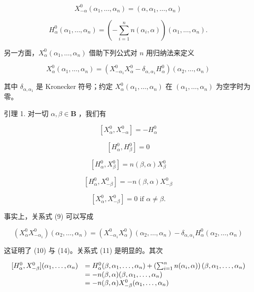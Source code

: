 \[
X _ {- \alpha} ^ {0} (\alpha_ {1}, \ldots , \alpha_ {n}) = (\alpha , \alpha_ {1}, \ldots , \alpha_ {n})\tag{7}
\]

\[
H _ {\alpha} ^ {0} \left(\alpha_ {1}, \dots , \alpha_ {n}\right) = \left(- \sum_ {i = 1} ^ {n} n \left(\alpha_ {i}, \alpha\right)\right) \left(\alpha_ {1}, \dots , \alpha_ {n}\right).\tag{8}
\]

另一方面，\(X_{\alpha}^{0}(\alpha_{1},\ldots ,\alpha_{n})\) 借助下列公式对 \(n\) 用归纳法来定义

\[
X _ {\alpha} ^ {0} (\alpha_ {1}, \ldots , \alpha_ {n}) = (X _ {- \alpha_ {1}} ^ {0} X _ {\alpha} ^ {0} - \delta_ {\alpha , \alpha_ {1}} H _ {\alpha} ^ {0}) (\alpha_ {2}, \ldots , \alpha_ {n})\tag{9}
\]

其中 \(\delta_{\alpha, \alpha_1}\) 是 Kronecker 符号；约定 \(X_{\alpha}^{0}(\alpha_{1}, \ldots, \alpha_{n})\) 在 \((\alpha_{1}, \ldots, \alpha_{n})\) 为空字时为零。

引理 1. 对一切 \(\alpha, \beta \in \mathbf{B}\) ，我们有

\[
[ X _ {\alpha} ^ {0}, X _ {- \alpha} ^ {0} ] = - H _ {\alpha} ^ {0}\tag{10}
\]

\[
[ H _ {\alpha} ^ {0}, H _ {\beta} ^ {0} ] = 0\tag{11}
\]

\[
[ H _ {\alpha} ^ {0}, X _ {\beta} ^ {0} ] = n (\beta , \alpha) X _ {\beta} ^ {0}\tag{12}
\]

\[
[ H _ {\alpha} ^ {0}, X _ {- \beta} ^ {0} ] = - n (\beta , \alpha) X _ {- \beta} ^ {0}\tag{13}
\]

\[
[ X _ {\alpha} ^ {0}, X _ {- \beta} ^ {0} ] = 0 \text {   if   } \alpha \neq \beta .\tag{14}
\]

事实上，关系式 (9) 可以写成

\[
(X _ {\alpha} ^ {0} X _ {- \alpha_ {1}} ^ {0}) (\alpha_ {2}, \ldots , \alpha_ {n}) = (X _ {- \alpha_ {1}} ^ {0} X _ {\alpha} ^ {0}) (\alpha_ {2}, \ldots , \alpha_ {n}) - \delta_ {\alpha , \alpha_ {1}} H _ {\alpha} ^ {0} (\alpha_ {2}, \ldots , \alpha_ {n})
\]

这证明了 (10) 与 (14)。关系式 (11) 是明显的。其次

\[
\begin{array}{r l} [ H _ {\alpha} ^ {0}, X _ {- \beta} ^ {0} ] (\alpha_ {1}, \ldots , \alpha_ {n}) & = H _ {\alpha} ^ {0} (\beta , \alpha_ {1}, \ldots , \alpha_ {n}) + \left(\sum_ {i = 1} ^ {n} n (\alpha_ {i}, \alpha)\right) (\beta , \alpha_ {1}, \ldots , \alpha_ {n}) \\ & = - n (\beta , \alpha) (\beta , \alpha_ {1}, \ldots , \alpha_ {n}) \\ & = - n (\beta , \alpha) X _ {- \beta} ^ {0} (\alpha_ {1}, \ldots , \alpha_ {n}) \end{array}
\]

